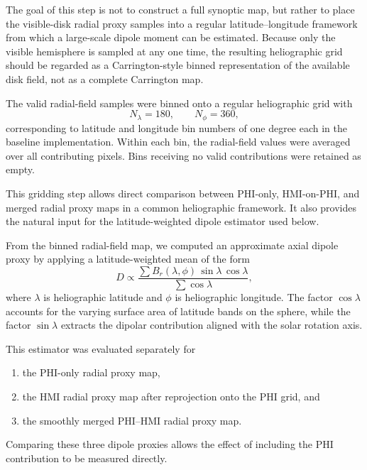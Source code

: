 \documentclass[namedreferences,hyperref,optionalrh]{spr-sola}
\begin{document}
The goal of this step is not to construct a full synoptic map, but rather to place the visible-disk radial proxy samples into a regular latitude--longitude framework from which a large-scale dipole moment can be estimated. Because only the visible hemisphere is sampled at any one time, the resulting heliographic grid should be regarded as a Carrington-style binned representation of the available disk field, not as a complete Carrington map.


The valid radial-field samples were binned onto a regular heliographic grid with
\begin{equation}
    N_{\lambda} = 180,\qquad N_{\phi} = 360,
\end{equation}
corresponding to latitude and longitude bin numbers of one degree each in the baseline implementation. Within each bin, the radial-field values were averaged over all contributing pixels. Bins receiving no valid contributions were retained as empty.

This gridding step allows direct comparison between PHI-only, HMI-on-PHI, and merged radial proxy maps in a common heliographic framework. It also provides the natural input for the latitude-weighted dipole estimator used below.


From the binned radial-field map, we computed an approximate axial dipole proxy by applying a latitude-weighted mean of the form
\begin{equation}
    D \propto
    \frac{\sum B_r(\lambda,\phi)\,\sin\lambda\,\cos\lambda}
         {\sum \cos\lambda},
\end{equation}
where $\lambda$ is heliographic latitude and $\phi$ is heliographic longitude. The factor $\cos\lambda$ accounts for the varying surface area of latitude bands on the sphere, while the factor $\sin\lambda$ extracts the dipolar contribution aligned with the solar rotation axis.

This estimator was evaluated separately for
\begin{enumerate}
    \item the PHI-only radial proxy map,
    \item the HMI radial proxy map after reprojection onto the PHI grid, and
    \item the smoothly merged PHI--HMI radial proxy map.
\end{enumerate}
Comparing these three dipole proxies allows the effect of including the PHI contribution to be measured directly.
\end{document}
